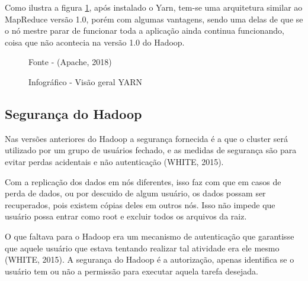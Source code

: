Como ilustra a figura \ref{Fig:Estrutura YARN}, após instalado o Yarn, tem-se uma arquitetura similar ao MapReduce versão 1.0, porém com algumas vantagens, sendo uma delas de que se o nó mestre parar de funcionar toda a aplicação ainda continua funcionando, coisa que não acontecia na versão 1.0 do Hadoop.


\begin{figure}[htbp!] \begin{center}
\caption{Infográfico - Visão geral YARN }
\small{Fonte - (Apache, 2018)}
\label{Fig:Estrutura YARN}
\end{center} \end{figure}

\newpage
\subsection{Segurança do Hadoop}

Nas versões anteriores do Hadoop a segurança fornecida é a que o cluster será utilizado por um grupo de usuários fechado, e as medidas de segurança são para evitar perdas acidentais e não autenticação (WHITE, 2015).

Com a replicação dos dados em nós diferentes, isso faz com que em casos de perda de dados, ou por descuido de algum usuário, os dados possam ser recuperados, pois existem cópias deles em outros nós. Isso não impede que usuário possa entrar como root e excluir todos os arquivos da raiz.

O que faltava para o Hadoop era um mecanismo de autenticação que garantisse que aquele usuário que estava tentando realizar tal atividade era ele mesmo (WHITE, 2015). A segurança do Hadoop é a autorização, apenas identifica se o usuário tem ou não a permissão para executar aquela tarefa desejada.

